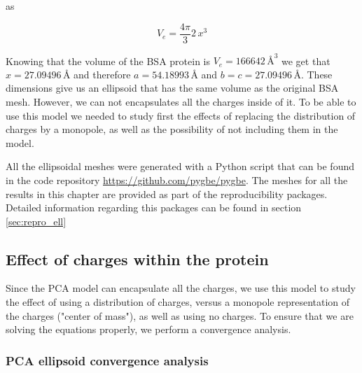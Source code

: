 as 

\begin{equation}
    V_e = \frac{4\pi}{3}2\,x^3
\end{equation}

Knowing that the volume of the BSA protein is $V_e = 166642 \, \text{\AA}^3$ we get that $x=27.09496 \, \text{\AA}$ 
and therefore $a=54.18993 \, \text{\AA}$ and $b=c=27.09496 \, \text{\AA}$. These dimensions give us an ellipsoid that has the same volume 
as the original BSA mesh. However, we can not encapsulates all the charges inside of it. To be able to use this model we needed to study first the 
effects of replacing the distribution of charges by a monopole, as well as the possibility of not including them in the model. 

All the ellipsoidal meshes were generated with a Python script that can be found in the code repository \url{https://github.com/pygbe/pygbe}. The
meshes for all the results in this chapter are provided as part of the reproducibility packages. Detailed information regarding this packages can be 
found in section \ref{sec:repro_ell}

\subsection{Effect of charges within the protein}

Since the PCA model can encapsulate all the charges, we use this model to study the effect of using a distribution of charges, versus
a monopole representation of the charges ("center of mass"), as well as using no charges. To ensure that we are solving the equations 
properly, we perform a convergence analysis.

\subsubsection{PCA ellipsoid convergence analysis}

